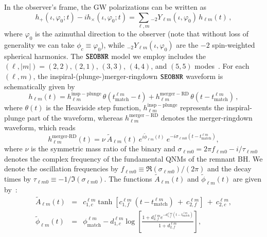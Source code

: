 In the observer's frame, the GW polarizations can be written as
%
\begin{equation}
h_+(\iota,\varphi_0;t ) - i h_\times(\iota,\varphi_0;t) = \sum_{\ell, m} {}_{-\!2}Y_{\ell m}(\iota,\varphi_0)\, h_{\ell m}(t)\,,
\end{equation}
%
where $\varphi_0$ is the azimuthal direction to the observer (note that without loss of generality we can take $\phi_c\equiv\varphi_0$), while ${}_{-\!2}Y_{\ell m}(\iota,\varphi_0)$ are the $-2$ spin-weighted spherical harmonics. The $\texttt{SEOBNR}$ model we employ includes the $(\ell, |m|)=(2,2),(2,1)$, $(3,3)$, $(4,4)$, and $(5,5)$ modes~\cite{Cotesta:2018fcv}. For each $(\ell, m)$, the inspiral-(plunge-)merger-ringdown $\texttt{SEOBNR}$ waveform is schematically given by
%
\begin{equation}
h_{\ell m}(t) = h_{\ell m}^\mathrm{insp-plunge}\, \theta(t_\mathrm{match}^{\ell m} - t) + h_{\ell m}^\mathrm{merger-RD}\,\theta(t-t_\mathrm{match}^{\ell m})\,,
\end{equation}
where $\theta(t)$ is the Heaviside step function, $h_{\ell m}^\mathrm{insp-plunge}$ represents the inspiral-plunge part of the waveform, whereas $h_{\ell m}^\mathrm{merger-RD}$ denotes the merger-ringdown waveform, which reads~\citep{Bohe:2016gbl,Cotesta:2018fcv}
%
\begin{equation}
\label{RD}
h_{\ell m}^{\textrm{merger-RD}}(t) = \nu \ \tilde{A}_{\ell m}(t)\ e^{i \tilde{\phi}_{\ell m}(t)} \ e^{-i \sigma_{\ell m 0}(t-t_{\textrm{match}}^{\ell m})},
\end{equation}
%
where $\nu$ is the symmetric mass ratio of the binary and $\sigma_{\ell m0} = 2\pi f_{\ell m 0} -i/\tau_{\ell m 0}$ denotes the complex frequency of the fundamental QNMs of the remnant BH. We denote the oscillation frequencies by $f_{\ell m  0}\equiv \Re(\sigma_{\ell m0})/(2\pi)$ and the decay times by $\tau_{\ell m 0}\equiv -1/\Im(\sigma_{\ell m0}) $.
The functions $\tilde{A}_{\ell m}(t)$ and $\tilde{\phi}_{\ell m}(t)$ are given by~\cite{Bohe:2016gbl,Cotesta:2018fcv}:
%
\begin{subequations}
\begin{eqnarray}
\label{eq:ansatz_amp}
\tilde{A}_{\ell m}(t) &=& c_{1,c}^{\ell m} \tanh[c_{1,f}^{\ell m}\ (t-t_{\textrm{match}}^{\ell m}) \ +\ c_{2,f}^{\ell m}] \ + \ c_{2,c}^{\ell m},\\
\label{eq:ansatz_phase}
\tilde{\phi}_{\ell m}(t) &=& \phi_{\textrm{match}}^{\ell m} - d_{1,c}^{\ell m} \log\left[\frac{1+d_{2,f}^{\ell m} e^{-d_{1,f}^{\ell m}(t-t_{\textrm{match}}^{\ell m})}}{1+d_{2,f}^{\ell m}}\right],
\end{eqnarray}
\end{subequations}
